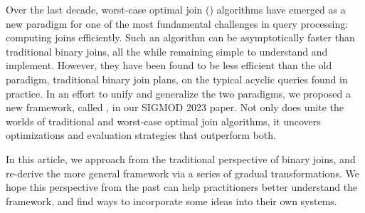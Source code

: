 Over the last decade, worst-case optimal join (\WCOJ) algorithms have
emerged as a new paradigm for one of the most fundamental challenges
in query processing: computing joins efficiently.  Such an algorithm
can be asymptotically faster than traditional binary joins, all the
while remaining simple to understand and implement.  However, they
have been found to be less efficient than the old paradigm,
traditional binary join plans, on the typical acyclic queries found in
practice.
In an effort to unify and generalize the two paradigms,
we proposed a new framework, called \FJ, in our SIGMOD 2023 paper.
Not only does \FJ unite the worlds of traditional and worst-case optimal
join algorithms, it uncovers optimizations and evaluation strategies
that outperform both.

In this article, we approach \FJ from the traditional perspective
of binary joins, and re-derive the more general framework
via a series of gradual transformations.
We hope this perspective from the past can help practitioners
better understand the \FJ framework,
and find ways to incorporate some ideas into their own systems.

